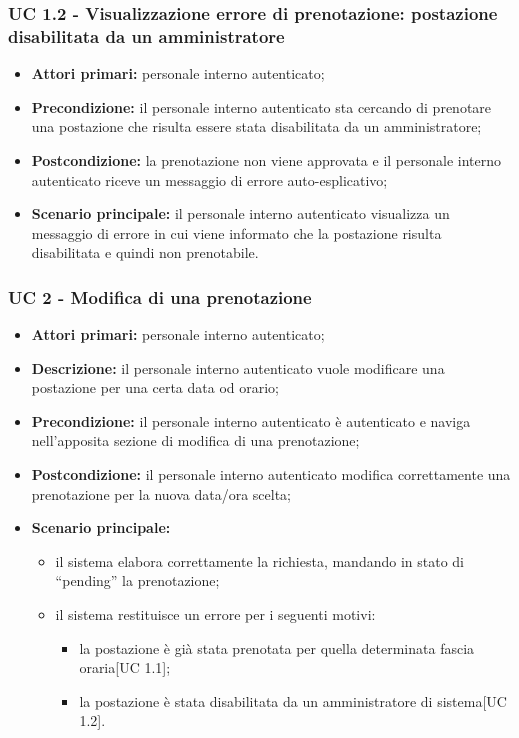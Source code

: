 \subsubsection{UC 1.2 - Visualizzazione errore di prenotazione: postazione disabilitata da un amministratore}
\begin{itemize}
\item \textbf{Attori primari:} personale interno autenticato;
\item \textbf{Precondizione:} il personale interno autenticato sta cercando di prenotare una postazione che risulta essere stata disabilitata da un amministratore;
\item \textbf{Postcondizione:} la prenotazione non viene approvata e il personale interno autenticato riceve un messaggio di errore auto-esplicativo;
\item \textbf{Scenario principale:} il personale interno autenticato visualizza un messaggio di errore in cui viene informato che la postazione risulta disabilitata e quindi non prenotabile.
\end{itemize}


\subsubsection{UC 2 - Modifica di una prenotazione}

\begin{itemize}
\item \textbf{Attori primari:} personale interno autenticato;
\item \textbf{Descrizione:} il personale interno autenticato vuole modificare una postazione per una certa data od orario;
\item \textbf{Precondizione:} il personale interno autenticato è autenticato e naviga nell’apposita sezione di modifica di una prenotazione;
\item \textbf{Postcondizione:} il personale interno autenticato modifica correttamente una prenotazione per la nuova data/ora scelta;
\item \textbf{Scenario principale:} 
	\begin{itemize}
		\item il sistema elabora correttamente la richiesta, mandando in stato di “pending” la prenotazione;
		\item il sistema restituisce un errore per i seguenti motivi:
		\begin{itemize}
			\item la postazione è già stata prenotata per quella determinata fascia oraria[UC 1.1];
			\item la postazione è stata disabilitata da un amministratore di sistema[UC 1.2].	
		\end{itemize}
	\end{itemize}
\end{itemize}

